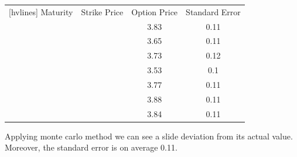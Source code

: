 
\begin{center}
	\begin{NiceTabular}{|c|c|c|c|}[hvlines]
		 Maturity & Strike Price & Option Price & Standard Error\\ 
		 &  & 3.83 & 0.11 \\ 
		& & 3.65 & 0.11 \\
		& & 3.73 & 0.12 \\
		& & 3.53 & 0.1  \\
		& & 3.77 & 0.11 \\
		& & 3.88 & 0.11 \\
		& & 3.84 & 0.11 \\
	\end{NiceTabular}
\end{center}

\noindent Applying monte carlo method we can see a slide deviation from its actual value. Moreover, the standard error is on average 0.11.


